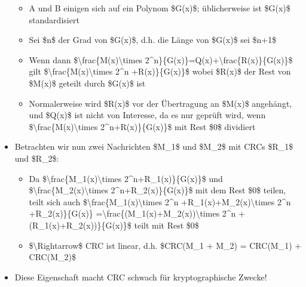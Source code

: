 \documentclass[a4paper]{article}
\begin{document}
\begin{multicols}{3}
\begin{itemize}
              \begin{itemize}
                  \item
                        A und B einigen sich auf ein Polynom \$G(x)\$; üblicherweise ist
                        \$G(x)\$ standardisiert
                  \item
                        Sei \$n\$ der Grad von \$G(x)\$, d.h. die Länge von \$G(x)\$ sei
                        \$n+1\$
                  \item
                        Wenn dann \$\textbackslash frac\{M(x)\textbackslash times
                        2\^{}n\}\{G(x)\}=Q(x)+\textbackslash frac\{R(x)\}\{G(x)\}\$ gilt
                        \$\textbackslash frac\{M(x)\textbackslash times 2\^{}n
                        +R(x)\}\{G(x)\}\$ wobei \$R(x)\$ der Rest von \$M(x)\$ geteilt durch
                        \$G(x)\$ ist
                  \item
                        Normalerweise wird \$R(x)\$ vor der Übertragung an \$M(x)\$
                        angehängt, und \$Q(x)\$ ist nicht von Interesse, da es nur geprüft
                        wird, wenn \$\textbackslash frac\{M(x)\textbackslash times
                        2\^{}n+R(x)\}\{G(x)\}\$ mit Rest \$0\$ dividiert
              \end{itemize}
        \item
              Betrachten wir nun zwei Nachrichten \$M\_1\$ und \$M\_2\$ mit CRCs
              \$R\_1\$ und \$R\_2\$:

              \begin{itemize}
                  \item
                        Da \$\textbackslash frac\{M\_1(x)\textbackslash times
                        2\^{}n+R\_1(x)\}\{G(x)\}\$ und
                        \$\textbackslash frac\{M\_2(x)\textbackslash times
                        2\^{}n+R\_2(x)\}\{G(x)\}\$ mit dem Rest \$0\$ teilen, teilt sich
                        auch \$\textbackslash frac\{M\_1(x)\textbackslash times 2\^{}n
                        +R\_1(x)+M\_2(x)\textbackslash times 2\^{}n +R\_2(x)\}\{G(x)\}
                        =\textbackslash frac\{(M\_1(x)+M\_2(x))\textbackslash times 2\^{}n
                        +(R\_1(x)+R\_2(x))\}\{G(x)\}\$ teilt mit Rest \$0\$
                  \item
                        \$\textbackslash Rightarrow\$ CRC ist linear, d.h. \$CRC(M\_1 +
                        M\_2) = CRC(M\_1) + CRC(M\_2)\$
              \end{itemize}
        \item
              Diese Eigenschaft macht CRC schwach für kryptographische Zwecke!
    \end{itemize}



\end{multicols}
\end{document}
